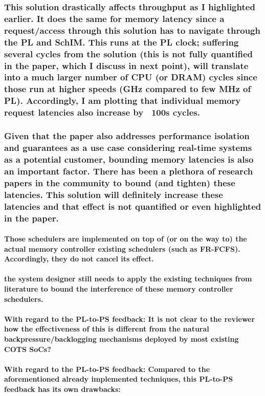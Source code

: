         \subsubsection{This solution drastically affects throughput as I highlighted earlier. It does the same for memory latency since a request/access through this solution has to navigate through the PL and SchIM. This runs at the PL clock; suffering several cycles from the solution (this is not fully quantified in the paper, which I discuss in next point),  will translate into a much larger number of CPU (or DRAM) cycles since those run at higher speeds (GHz compared to few MHz of PL). Accordingly, I am plotting that individual memory request latencies also increase by ~100s cycles.}


        \subsubsection{Given that the paper also addresses performance isolation and guarantees as a use case considering real-time systems as a potential customer, bounding memory latencies is also an important factor. There has been a plethora of research papers in the community to bound (and tighten) these latencies. This solution will definitely increase these latencies and that effect is not quantified or even highlighted in the paper.}

            \paragraph{Those schedulers are implemented on top of (or on the way to) the actual memory controller existing schedulers (such as FR-FCFS). Accordingly, they do not cancel its effect.}

            \paragraph{the system designer still needs to apply the existing techniques from literature to bound the interference of these memory controller schedulers.}

            \paragraph{With regard to the PL-to-PS feedback: It is not clear to the reviewer how the effectiveness of this is different from the natural backpressure/backlogging mechanisms deployed by most existing COTS SoCs?}

            \paragraph{With regard to the PL-to-PS feedback: Compared to the aforementioned already implemented techniques, this PL-to-PS feedback has its own drawbacks:}

